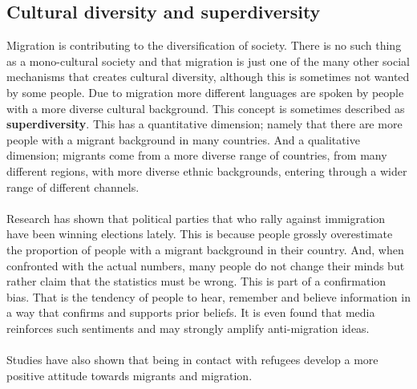 \documentclass[../summary.tex]{subfiles}
\begin{document}
 	\subsection{Cultural diversity and superdiversity}
 	Migration is contributing to the diversification of society. There is no such thing as a mono-cultural society and that migration is just one of the many other social mechanisms that creates cultural diversity, although this is sometimes not wanted by some people. Due to migration more different languages are spoken by people with a more diverse cultural background. This concept is sometimes described as \textbf{superdiversity}. This has a quantitative dimension; namely  that there are more people with a migrant background in many countries. And a qualitative dimension; migrants come from a more diverse range of countries, from many different regions, with more diverse ethnic backgrounds, entering through a wider range of different channels.
 	\\
 	\\
 	Research has shown that political parties that who rally against immigration have been winning elections lately. This is because people grossly overestimate the proportion of people with a migrant background in their country. And, when confronted with the actual numbers,
 	many people do not change their minds but rather claim that the statistics must be wrong. This is part of a confirmation bias. That is the tendency of people to hear, remember and believe information in a way that confirms and supports prior beliefs. It is even found that media reinforces such sentiments and may strongly amplify anti-migration ideas.
 	\\
 	\\
 	Studies have also shown that being in contact with refugees develop a more positive attitude towards migrants and migration.
 	
\end{document}
